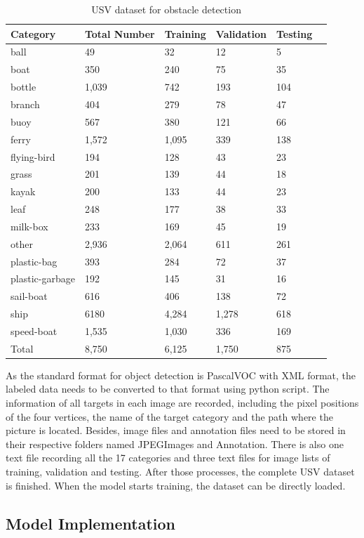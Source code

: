 \documentclass[sensors,article,submit,moreauthors,pdftex]{Definitions/mdpi}
\begin{document}
\begin{paracol}{2}
\begin{table}[htbp]
\centering
\caption{USV dataset for obstacle detection}
\begin{tabular}{llllll} 
\toprule
\textbf{Category}&\textbf{Total Number}&\textbf{Training}&\textbf{Validation}&\textbf{Testing}\\
\midrule
ball& 49& 32& 12& 5 \\
boat& 350& 240& 75& 35 \\
bottle& 1,039& 742& 193& 104 \\
branch& 404& 279& 78& 47 \\
buoy& 567& 380& 121& 66 \\
ferry& 1,572& 1,095& 339& 138 \\
flying-bird& 194& 128& 43& 23 \\
grass& 201& 139& 44& 18 \\
kayak& 200& 133& 44& 23 \\
leaf& 248& 177& 38& 33 \\
milk-box& 233& 169& 45& 19 \\
other& 2,936& 2,064& 611& 261 \\
plastic-bag& 393& 284& 72& 37 \\
plastic-garbage& 192& 145& 31& 16 \\
sail-boat& 616& 406& 138& 72 \\
ship& 6180& 4,284& 1,278& 618 \\
speed-boat& 1,535& 1,030& 336& 169 \\
\cmidrule(r){1-5}
Total& 8,750& 6,125& 1,750& 875 \\
\bottomrule
\end{tabular}
\label{tbl:USV dataset for obstacle detection}
\end{table}


As the standard format for object detection is PascalVOC with XML format, the labeled data needs to be converted to that format using python script. The information of all targets in each image are recorded, including the pixel positions of the four vertices, the name of the target category and the path where the picture is located.
Besides, image files and annotation files need to be stored in their respective folders named JPEGImages and Annotation. There is also one text file recording all the 17 categories and three text files for image lists of training, validation and testing. After those processes, the complete USV dataset is finished. When the model starts training, the dataset can be directly loaded.


\subsection{Model Implementation}


\end{paracol}
\end{document}
